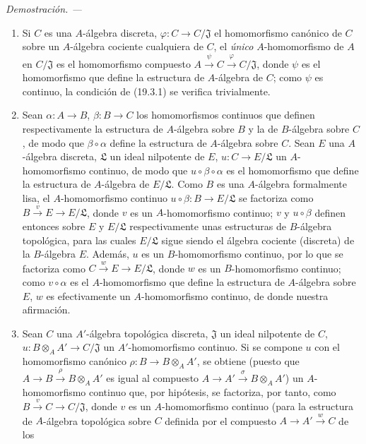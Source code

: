 \documentclass[10pt,oneside]{book}
\newenvironment{proof}{%
  \par\medskip\noindent\textit{Demostración. ---\ }}{\par}
\begin{document}
\begin{proof}
\begin{enumerate}
  \item[(i)] Si $C$ es una $A$-álgebra discreta,
  $\varphi:C\to C/\mathfrak J$ el homomorfismo canónico de $C$ sobre un
  $A$-álgebra cociente cualquiera de $C$, el \emph{único} $A$-homomorfismo
  de $A$ en $C/\mathfrak J$ es el homomorfismo compuesto
  $A\xrightarrow{\psi}C\xrightarrow{\varphi}C/\mathfrak J$, donde
  $\psi$ es el homomorfismo que define la estructura de $A$-álgebra de
  $C$; como $\psi$ es continuo, la condición de (19.3.1) se verifica
  trivialmente.
  \item[(ii)] Sean $\alpha:A\to B$, $\beta:B\to C$ los homomorfismos
  continuos que definen respectivamente la estructura de $A$-álgebra sobre $B$ y
  la de $B$-álgebra sobre $C$, de modo que $\beta\circ\alpha$ define la
  estructura de $A$-álgebra sobre $C$. Sean $E$ una $A$-álgebra discreta,
  $\mathfrak L$ un ideal nilpotente de $E$, $u:C\to E/\mathfrak L$ un
  $A$-homomorfismo continuo, de modo que $u\circ\beta\circ\alpha$ es
  el homomorfismo que define la estructura de $A$-álgebra de
  $E/\mathfrak L$. Como $B$ es una $A$-álgebra formalmente lisa, el
  $A$-homomorfismo continuo $u\circ\beta:B\to E/\mathfrak L$ se
  factoriza como $B\xrightarrow{v}E\to E/\mathfrak L$, donde $v$ es un
  $A$-homomorfismo continuo; $v$ y $u\circ\beta$ definen entonces sobre
  $E$ y $E/\mathfrak L$ respectivamente unas estructuras de $B$-álgebra
  topológica, para las cuales $E/\mathfrak L$ sigue siendo el álgebra cociente
  (discreta) de la $B$-álgebra $E$. Además, $u$ es un $B$-homomorfismo
  continuo, por lo que se factoriza como $C\xrightarrow{w}E\to E/\mathfrak L$,
  donde $w$ es un $B$-homomorfismo continuo; como
  $v\circ\alpha$ es el $A$-homomorfismo que define la estructura de
  $A$-álgebra sobre $E$, $w$ es efectivamente un $A$-homomorfismo continuo, de donde nuestra
  afirmación.
  \item[(iii)] Sean $C$ una $A'$-álgebra topológica discreta,
  $\mathfrak J$ un ideal nilpotente de $C$,
  $u:B\otimes_A A'\to C/\mathfrak J$ un $A'$-homomorfismo continuo. Si se
  compone $u$ con el homomorfismo canónico
  $\rho:B\to B\otimes_A A'$, se obtiene (puesto que
  $A\to B\xrightarrow{\rho}B\otimes_A A'$ es igual al compuesto
  $A\to A'\xrightarrow{\sigma}B\otimes_A A'$) un $A$-homomorfismo
  continuo que, por hipótesis, se factoriza, por tanto, como
  $B\xrightarrow{v}C\to C/\mathfrak J$, donde $v$ es un $A$-homomorfismo
  continuo (para la estructura de $A$-álgebra
  topológica sobre $C$ definida por el compuesto $A\to A'\xrightarrow{w}C$ de los

\end{enumerate}
\end{proof}
\end{document}
